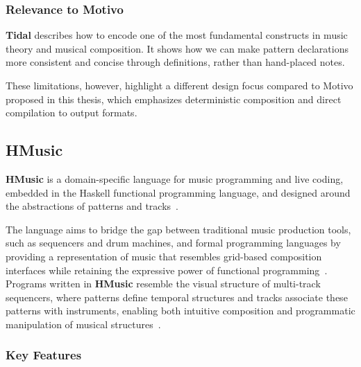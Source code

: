 
\subsubsection{Relevance to Motivo}

\textbf{Tidal} describes how to encode one of the most fundamental constructs in music theory and musical composition.
It shows how we can make pattern declarations more consistent and concise through definitions, rather than hand-placed
notes.

These limitations, however, highlight a different design focus compared to Motivo proposed in this thesis,
which emphasizes deterministic composition and direct compilation to output formats.


\subsection{HMusic}\label{detail-subsec:hmusic}

\textbf{HMusic} is a domain-specific language for music programming and live coding, embedded in the Haskell functional
programming language, and designed around the abstractions of patterns and tracks~\cite{Du_Bois_Ribeiro_2019}.

The language aims to bridge the gap between traditional music production tools, such as sequencers and drum machines,
and formal programming languages by providing a representation of music that resembles grid-based composition interfaces
while retaining the expressive power of functional programming~\cite{Du_Bois_Ribeiro_2019}.
Programs written in \textbf{HMusic} resemble the visual structure of multi-track sequencers, where patterns define
temporal structures and tracks associate these patterns with instruments, enabling both intuitive composition and
programmatic manipulation of musical structures~\cite{Du_Bois_Ribeiro_2019}.


\subsubsection{Key Features}

